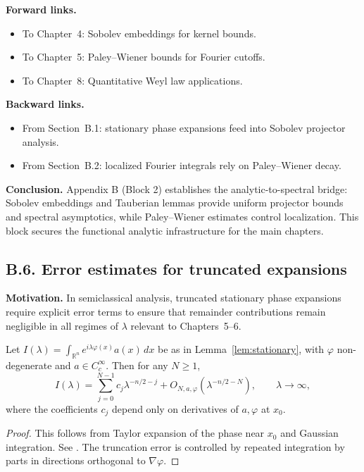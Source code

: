 \noindent
\textbf{Forward links.}
\begin{itemize}
  \item To Chapter~4: Sobolev embeddings for kernel bounds.  
  \item To Chapter~5: Paley–Wiener bounds for Fourier cutoffs.  
  \item To Chapter~8: Quantitative Weyl law applications.  
\end{itemize}

\noindent
\textbf{Backward links.}
\begin{itemize}
  \item From Section~B.1: stationary phase expansions feed into Sobolev projector analysis.  
  \item From Section~B.2: localized Fourier integrals rely on Paley–Wiener decay.  
\end{itemize}

\bigskip
\noindent
\textbf{Conclusion.}
Appendix B (Block 2) establishes the analytic-to-spectral bridge: Sobolev embeddings
and Tauberian lemmas provide uniform projector bounds and spectral asymptotics,
while Paley--Wiener estimates control localization. This block secures the functional
analytic infrastructure for the main chapters.

\subsection*{B.6. Error estimates for truncated expansions}

\noindent
\textbf{Motivation.}
In semiclassical analysis, truncated stationary phase expansions require explicit error terms
to ensure that remainder contributions remain negligible in all regimes of $\lambda$ relevant
to Chapters~5--6.

\begin{proposition}\label{prop:stationary-error}
Let $I(\lambda)=\int_{\mathbb R^n} e^{i\lambda\varphi(x)} a(x)\,dx$ be as in
Lemma~\ref{lem:stationary}, with $\varphi$ non-degenerate and $a\in C_c^\infty$.
Then for any $N\ge 1$,
\[
I(\lambda) = \sum_{j=0}^{N-1} c_j \lambda^{-n/2-j}
+ O_{N,a,\varphi}(\lambda^{-n/2-N}), \qquad \lambda\to\infty,
\]
where the coefficients $c_j$ depend only on derivatives of $a,\varphi$ at $x_0$.
\end{proposition}

\begin{proof}
This follows from Taylor expansion of the phase near $x_0$ and Gaussian integration.
See \cite[Chap.~7]{Hormander1983}. The truncation error is controlled by repeated
integration by parts in directions orthogonal to $\nabla\varphi$.
\end{proof}

